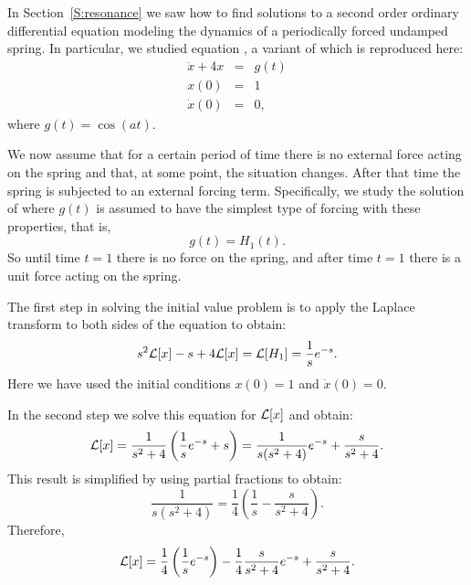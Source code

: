 \label{S:13.4}


In Section~\ref{S:resonance} we saw how to find solutions to a second 
order ordinary differential equation modeling the dynamics of a periodically
forced undamped spring.  
In particular, we studied equation , a variant of 
which is reproduced here:
\begin{equation}  \label{eq:ivH1}
\begin{array}{rcl}
   \ddot{x} + 4x & = & g(t) \\
    x(0) & = & 1 \\
    \dot{x}(0) & = & 0,
\end{array}
\end{equation}
where $g(t)=\cos(at)$.

We now assume that for a certain period of time there is no external 
force
acting on the spring and that, at some point, the situation changes. 
After that time the spring is subjected to an external forcing term.  
Specifically, we study the solution of  where $g(t)$ is 
assumed to have the simplest type of forcing with these properties, 
that is,  
\begin{equation}  \label{eq:Heavy1}
g(t) = H_1(t). 
\end{equation}
So until time $t=1$ there is no force on the spring, and after time $t=1$
there is a unit force acting on the spring.

The first step in solving the initial value problem  is to 
apply the Laplace transform to both sides of the equation to obtain:
\[
s^2{\cal L}[x]-s + 4{\cal L}[x] = {\cal L}[H_1] = \frac{1}{s}e^{-s}.
\]
Here we have used the initial conditions $x(0)=1$ and $\dot{x}(0)=0$.

In the second step we solve this equation for ${\cal L}[x]$ and obtain: 
\[
{\cal L}[x] = \frac{1}{s^2+4}\left( \frac{1}{s}e^{-s}+s\right)
=\frac{1}{s(s^2+4)}e^{-s}+\frac{s}{s^2+4}.
\]
This result is simplified by using partial fractions to obtain:
\[
\frac{1}{s(s^2+4)}=\frac{1}{4}\left(\frac{1}{s}-\frac{s}{s^2+4}\right).
\]
Therefore,
\[
{\cal L}[x] = \frac{1}{4}\left(\frac{1}{s}e^{-s}\right) -
\frac{1}{4}\frac{s}{s^2+4}e^{-s} + \frac{s}{s^2+4}.
\]

